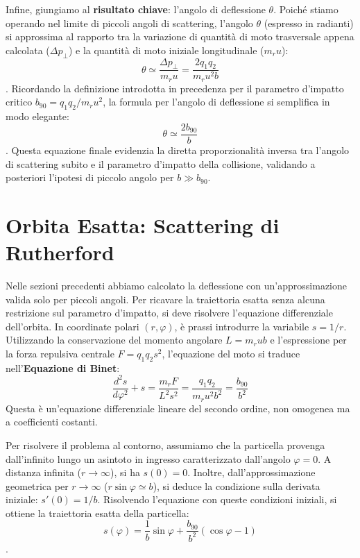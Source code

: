 Infine, giungiamo al \textbf{risultato chiave}: l'angolo di deflessione $\theta$. Poiché stiamo operando nel limite di piccoli angoli di scattering, l'angolo $\theta$ (espresso in radianti) si approssima al rapporto tra la variazione di quantità di moto trasversale appena calcolata ($\Delta p_{\perp}$) e la quantità di moto iniziale longitudinale ($m_r u$):
\begin{equation}
\theta \simeq \frac{\Delta p_{\perp}}{m_r u} = \frac{2 q_1 q_2}{m_r u^2 b}
\end{equation}
. Ricordando la definizione introdotta in precedenza per il parametro d'impatto critico $b_{90} = q_1 q_2 / m_r u^2$, la formula per l'angolo di deflessione si semplifica in modo elegante:
\begin{equation}
\theta \simeq \frac{2 b_{90}}{b}
\end{equation}
. Questa equazione finale evidenzia la diretta proporzionalità inversa tra l'angolo di scattering subito e il parametro d'impatto della collisione, validando a posteriori l'ipotesi di piccolo angolo per $b \gg b_{90}$.

\section{Orbita Esatta: Scattering di Rutherford}

Nelle sezioni precedenti abbiamo calcolato la deflessione con un'approssimazione valida solo per piccoli angoli. Per ricavare la traiettoria esatta senza alcuna restrizione sul parametro d'impatto, si deve risolvere l'equazione differenziale dell'orbita.
In coordinate polari $(r, \varphi)$, è prassi introdurre la variabile $s = 1/r$. Utilizzando la conservazione del momento angolare $L = m_r u b$ e l'espressione per la forza repulsiva centrale $F = q_1 q_2 s^2$, l'equazione del moto si traduce nell'\textbf{Equazione di Binet}:
\begin{equation}
\frac{d^2s}{d\varphi^2} + s = \frac{m_r F}{L^2 s^2} = \frac{q_1 q_2}{m_r u^2 b^2} = \frac{b_{90}}{b^2}
\end{equation}
Questa è un'equazione differenziale lineare del secondo ordine, non omogenea ma a coefficienti costanti.

Per risolvere il problema al contorno, assumiamo che la particella provenga dall'infinito lungo un asintoto in ingresso caratterizzato dall'angolo $\varphi = 0$. A distanza infinita ($r \to \infty$), si ha $s(0) = 0$. Inoltre, dall'approssimazione geometrica per $r \to \infty$ ($r \sin\varphi \simeq b$), si deduce la condizione sulla derivata iniziale: $s'(0) = 1/b$.
Risolvendo l'equazione con queste condizioni iniziali, si ottiene la traiettoria esatta della particella:
\begin{equation}
s(\varphi) = \frac{1}{b} \sin\varphi + \frac{b_{90}}{b^2} (\cos\varphi - 1)
\end{equation}
.

